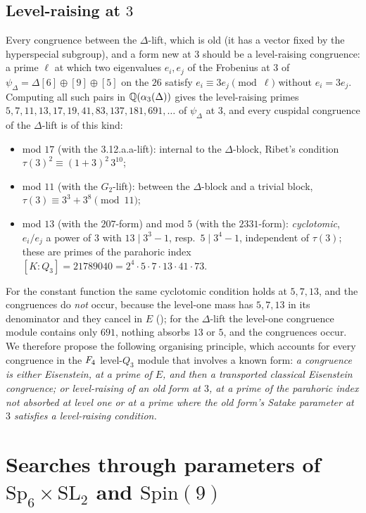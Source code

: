 \documentclass[11pt]{amsart}
\theoremstyle{definition}
\begin{document}
\subsection{Level-raising at $3$} Every congruence between the $\Delta$-lift, which is old (it has a vector fixed by the hyperspecial subgroup), and a form new at $3$ should be a level-raising congruence: a prime $\ell$ at which two eigenvalues $e_i,e_j$ of the Frobenius at $3$ of $\psi_\Delta=\Delta[6]\oplus[9]\oplus[5]$ on the $26$ satisfy $e_i\equiv3e_j\pmod\ell$ without $e_i=3e_j$. Computing all such pairs in $\mathbb{Q}(\alpha_3(\Delta))$ gives the level-raising primes $5,7,11,13,17,19,41,83,137,181,691,\dots$ of $\psi_\Delta$ at $3$, and every cuspidal congruence of the $\Delta$-lift is of this kind:
\begin{itemize}
\item mod $17$ (with the \textsf{3.12.a.a}-lift): internal to the $\Delta$-block, Ribet's condition $\tau(3)^2\equiv(1+3)^2\,3^{10}$;
\item mod $11$ (with the $G_2$-lift): between the $\Delta$-block and a trivial block, $\tau(3)\equiv3^3+3^8\pmod{11}$;
\item mod $13$ (with the $207$-form) and mod $5$ (with the $2331$-form): \emph{cyclotomic}, $e_i/e_j$ a power of $3$ with $13\mid3^3-1$, resp.\ $5\mid3^4-1$, independent of $\tau(3)$; these are primes of the parahoric index $[K:Q_3]=21789040=2^4\cdot5\cdot7\cdot13\cdot41\cdot73$.
\end{itemize}
For the constant function the same cyclotomic condition holds at $5,7,13$, and the congruences do \emph{not} occur, because the level-one mass has $5,7,13$ in its denominator and they cancel in $E$ (\cite[Thm.~2.1]{PartI}); for the $\Delta$-lift the level-one congruence module contains only $691$, nothing absorbs $13$ or $5$, and the congruences occur. We therefore propose the following organising principle, which accounts for every congruence in the $F_4$ level-$Q_3$ module that involves a known form: \emph{a congruence is either Eisenstein, at a prime of $E$, and then a transported classical Eisenstein congruence; or level-raising of an old form at $3$, at a prime of the parahoric index not absorbed at level one or at a prime where the old form's Satake parameter at $3$ satisfies a level-raising condition.}

\section{Searches through parameters of $\mathrm{Sp}_6\times\mathrm{SL}_2$ and $\mathrm{Spin}(9)$}
\end{document}
